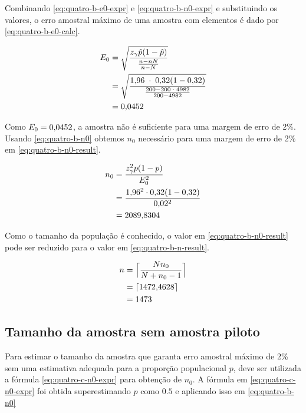 	Combinando \eqref{eq:quatro-b-e0-expr} e \eqref{eq:quatro-b-n0-expr} e
	substituindo os valores, o erro amostral máximo de uma amostra com
	\QUATROn elementos é dado por \eqref{eq:quatro-b-e0-calc}.

	\begin{align}
		\label{eq:quatro-b-e0-calc}
		E_0 &= \sqrt{\frac{z_\gamma \hat{p}(1 - \hat{p}) }{\frac{n-n N}{n - N}}} \\
			&= \sqrt{\frac{\num{1.96} \;\cdot\; \num{0.32} (1 - \num{0.32}) }{\frac{200 - 200 \;\cdot\; 4982}{200 - 4982}}} \nonumber \\
			&= \num{0.0452} \nonumber
	\end{align}

	Como $E_0 = \num{0.0452}$, a amostra não é suficiente para uma margem de
	erro de 2\%. Usando \eqref{eq:quatro-b-n0} obtemos $n_0$ necessário para
	uma margem de erro de 2\% em \eqref{eq:quatro-b-n0-result}.

	\begin{align}
		n_0 &= \frac{z_\gamma^2 p(1-p)}{E_0^2} \nonumber \\
			&= \frac{\num{1.96}^2 \cdot \num{0.32}(1-\num{0.32})}{\num{0.02}^2} \nonumber \\
			&= \label{eq:quatro-b-n0-result}
			   \num{2089.8304}	
	\end{align}

	Como o tamanho da população é conhecido, o valor em
	\eqref{eq:quatro-b-n0-result} pode ser reduzido para o valor em
	\eqref{eq:quatro-b-n-result}.

	\begin{align}
		n &= \Big\lceil \frac{N n_0}{N + n_0 - 1} \nonumber \Big\rceil \\
		  &= \lceil \num{1472.4628} \nonumber \rceil \\
		  &= \label{eq:quatro-b-n-result} 1473
	\end{align}

\subsection{Tamanho da amostra sem amostra piloto}

	Para estimar o tamanho da amostra que garanta erro amostral máximo de
	2\% sem uma estimativa adequada para a proporção populacional $p$, deve
	ser utilizada a fórmula \eqref{eq:quatro-c-n0-expr} para obtenção de
	$n_0$. A fórmula em \eqref{eq:quatro-c-n0-expr} foi obtida
	superestimando $p$ como $\num{0.5}$ e aplicando isso em \eqref{eq:quatro-b-n0}

